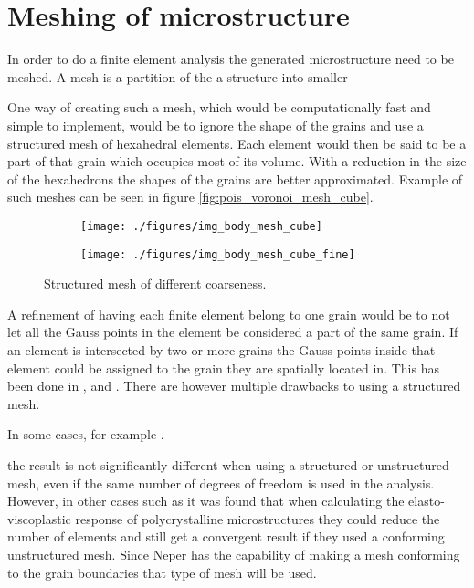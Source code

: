 \documentclass[meshing_micro.tex]{subfiles}
\begin{document}
\chapter{Meshing of microstructure}

In order to do a finite element analysis the generated microstructure need to be meshed. A mesh is a partition of the a structure into smaller 

One way of creating such a mesh, which would be computationally fast and simple to implement, would be to ignore the shape of the grains and use a structured mesh of hexahedral elements. Each element would then be said to be a part of that grain which occupies most of its volume. With a reduction in the size of the hexahedrons the shapes of the grains are better approximated. Example of such meshes can be seen in figure \ref{fig:pois_voronoi_mesh_cube}.

\begin{figure}
\centering
\begin{subfigure}[b]{.5\textwidth}
  \centering
  \texttt{[image: ./figures/img\_body\_mesh\_cube]}
  \caption{}
  \label{fig:mesh_a}
\end{subfigure}%
\begin{subfigure}[b]{.5\textwidth}
  \centering
  \texttt{[image: ./figures/img\_body\_mesh\_cube\_fine]}
  \caption{}
  \label{fig:mesh_b}
\end{subfigure}
\caption{Structured mesh of different coarseness.}
\label{fig:mesh}
\end{figure}

A refinement of having each finite element belong to one grain would be to not let all the Gauss points in the element be considered a part of the same grain. If an element is intersected by two or more grains the Gauss points inside that element could be assigned to the grain they are spatially located in. This has been done in \cite{Nygards20031049}, \cite{Cailletaud2003351} and \cite{Barbe2001513}. There are however multiple drawbacks to using a structured mesh. 



 In some cases, for example \cite{Bohlke201011}. 


 the result is not significantly different when using a structured or unstructured mesh, even if the same number of degrees of freedom is used in the analysis. However, in other cases such as \cite{Li20091163} it was found that when calculating the elasto-viscoplastic response of polycrystalline microstructures they could reduce the number of elements and still get a convergent result if they used a conforming unstructured mesh. Since Neper has the capability of making a mesh conforming to the grain boundaries that type of mesh will be used. 
\end{document}
